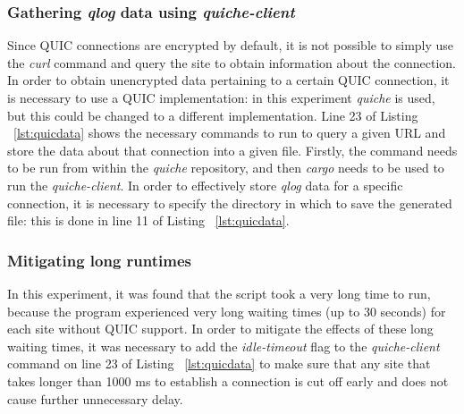 \documentclass{l4proj}
\begin{document}
\subsubsection{Gathering \emph{qlog} data using \emph{quiche-client}} Since QUIC connections are encrypted by default, it is not possible to simply use the \emph{curl} command and query the site to obtain information about the connection. In order to obtain unencrypted data pertaining to a certain QUIC connection, it is necessary to use a QUIC implementation: in this experiment \emph{quiche} is used, but this could be changed to a different implementation. Line 23 of Listing ~\ref{lst:quicdata} shows the necessary commands to run to query a given URL and store the data about that connection into a given file. Firstly, the command needs to be run from within the \emph{quiche} repository, and then \emph{cargo} needs to be used to run the \emph{quiche-client}. In order to effectively store \emph{qlog} data for a specific connection, it is necessary to specify the directory in which to save the generated file: this is done in line 11 of Listing ~\ref{lst:quicdata}.

\subsubsection{Mitigating long runtimes} In this experiment, it was found that the script took a very long time to run, because the program experienced very long waiting times (up to 30 seconds) for each site without QUIC support. In order to mitigate the effects of these long waiting times, it was necessary to add the \emph{idle-timeout} flag to the \emph{quiche-client} command on line 23 of Listing ~\ref{lst:quicdata} to make sure that any site that takes longer than 1000 ms to establish a connection is cut off early and does not cause further unnecessary delay.
\end{document}
